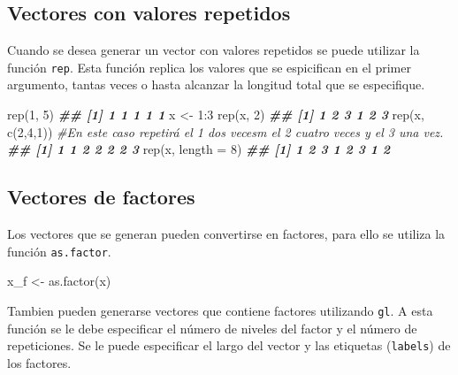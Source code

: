 \documentclass[
]{book}
\newenvironment{Shaded}{\begin{snugshade}}{\end{snugshade}}
\newcommand{\AttributeTok}[1]{\textcolor[rgb]{0.77,0.63,0.00}{#1}}
\newcommand{\CommentTok}[1]{\textcolor[rgb]{0.56,0.35,0.01}{\textit{#1}}}
\newcommand{\DecValTok}[1]{\textcolor[rgb]{0.00,0.00,0.81}{#1}}
\newcommand{\DocumentationTok}[1]{\textcolor[rgb]{0.56,0.35,0.01}{\textbf{\textit{#1}}}}
\newcommand{\FunctionTok}[1]{\textcolor[rgb]{0.00,0.00,0.00}{#1}}
\newcommand{\NormalTok}[1]{#1}
\newcommand{\OtherTok}[1]{\textcolor[rgb]{0.56,0.35,0.01}{#1}}
\newcommand{\SpecialCharTok}[1]{\textcolor[rgb]{0.00,0.00,0.00}{#1}}
\begin{document}
\hypertarget{vectores-con-valores-repetidos}{%
\subsection{Vectores con valores repetidos}\label{vectores-con-valores-repetidos}}

Cuando se desea generar un vector con valores repetidos se puede utilizar la función \texttt{rep}. Esta función replica los valores que se espicifican en el primer argumento, tantas veces o hasta alcanzar la longitud total que se especifique.

\begin{Shaded}
\begin{Highlighting}[]
\FunctionTok{rep}\NormalTok{(}\DecValTok{1}\NormalTok{, }\DecValTok{5}\NormalTok{)}
\DocumentationTok{\#\# [1] 1 1 1 1 1}
\NormalTok{x }\OtherTok{\textless{}{-}} \DecValTok{1}\SpecialCharTok{:}\DecValTok{3}
\FunctionTok{rep}\NormalTok{(x, }\DecValTok{2}\NormalTok{)}
\DocumentationTok{\#\# [1] 1 2 3 1 2 3}
\FunctionTok{rep}\NormalTok{(x, }\FunctionTok{c}\NormalTok{(}\DecValTok{2}\NormalTok{,}\DecValTok{4}\NormalTok{,}\DecValTok{1}\NormalTok{)) }\CommentTok{\#En este caso repetirá el 1 dos vecesm el 2 cuatro veces y el 3 una vez.}
\DocumentationTok{\#\# [1] 1 1 2 2 2 2 3}
\FunctionTok{rep}\NormalTok{(x, }\AttributeTok{length =} \DecValTok{8}\NormalTok{)}
\DocumentationTok{\#\# [1] 1 2 3 1 2 3 1 2}
\end{Highlighting}
\end{Shaded}

\hypertarget{vectores-de-factores}{%
\subsection{Vectores de factores}\label{vectores-de-factores}}

Los vectores que se generan pueden convertirse en factores, para ello se utiliza la función \texttt{as.factor}.

\begin{Shaded}
\begin{Highlighting}[]
\NormalTok{x\_f }\OtherTok{\textless{}{-}} \FunctionTok{as.factor}\NormalTok{(x)}
\end{Highlighting}
\end{Shaded}

Tambien pueden generarse vectores que contiene factores utilizando \texttt{gl}. A esta función se le debe especificar el número de niveles del factor y el número de repeticiones. Se le puede especificar el largo del vector y las etiquetas (\texttt{labels}) de los factores.
\end{document}
